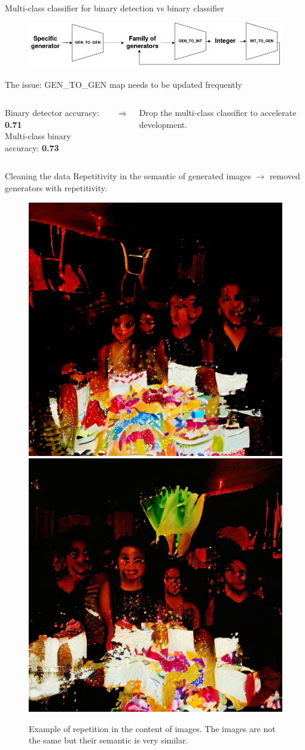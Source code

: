 \documentclass[11pt,compress]{beamer} %
\begin{document}
\begin{frame}{Multi-class classifier for binary detection vs binary classifier}
  \begin{figure}
    \includegraphics[width=.9\textwidth]{img/maps.png}
  \end{figure}
  The issue: GEN\_TO\_GEN map needs to be updated frequently\\
  \vspace*{.5cm}
  \begin{columns}
    \begin{column}{.5\textwidth}
      Binary detector accuracy: \textbf{0.71}\\
      Multi-class binary accuracy: \textbf{0.73} 
    \end{column}

    \begin{column}{.05\textwidth}
      \huge
      $\Rightarrow$
    \end{column}

    \begin{column}{.4\textwidth}
      Drop the multi-class classifier to accelerate development.
    \end{column}
  \end{columns}
\end{frame}

\begin{frame}{Cleaning the data}
  \centering
  Repetitivity in the semantic of generated images $\rightarrow$ removed generators with repetitivity.
  \begin{figure}[H]
    \centering
    \includegraphics[width=.4\textwidth]{img/birthday1.png}
    \includegraphics[width=.4\textwidth]{img/birthday2.png}
    \caption{Example of repetition in the content of images. The images are not the same but their semantic is very similar.}
    \label{fig:repetition}
  \end{figure}
\end{frame}
\end{document}
